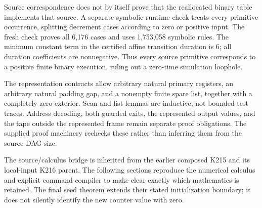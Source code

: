 Source correspondence does not by itself prove that the reallocated binary table implements that source. A separate symbolic runtime check treats every primitive occurrence, splitting decrement cases according to zero or positive input. The fresh check proves all 6,176 cases and uses 1,753,058 symbolic rules. The minimum constant term in the certified affine transition duration is 6; all duration coefficients are nonnegative. Thus every source primitive corresponds to a positive finite binary execution, ruling out a zero-time simulation loophole.

The representation contracts allow arbitrary natural primary registers, an arbitrary natural padding gap, and a nonempty finite spare list, together with a completely zero exterior. Scan and list lemmas are inductive, not bounded test traces. Address decoding, both guarded exits, the represented output values, and the tape outside the represented frame remain separate proof obligations. The supplied proof machinery rechecks these rather than inferring them from the source DAG size.

The source/calculus bridge is inherited from the earlier composed K215 and its local-input K216 parent. The following sections reproduce the numerical calculus and explicit command compiler to make clear exactly which mathematics is retained. The final seed theorem extends their stated initialization boundary; it does not silently identify the new counter value with zero.
